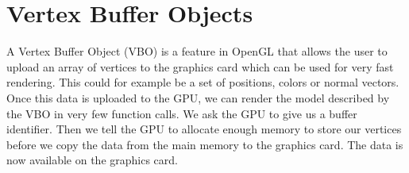 \section{Vertex Buffer Objects}
\label{sec:opengl_vbo}
A Vertex Buffer Object (VBO) is a feature in OpenGL that allows the user to upload an array of vertices to the graphics card which can be used for very fast rendering. This could for example be a set of positions, colors or normal vectors. Once this data is uploaded to the GPU, we can render the model described by the VBO in very few function calls. We ask the GPU to give us a buffer identifier. Then we tell the GPU to allocate enough memory to store our vertices before we copy the data from the main memory to the graphics card. The data is now available on the graphics card. 